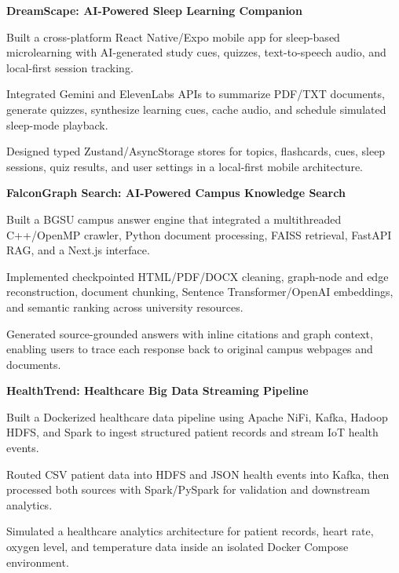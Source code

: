 \documentclass[letterpaper,10pt]{article}
\newcommand{\projectHeading}[2]{
  \vspace{2pt}
  \textbf{#1} \hfill #2
}
\begin{document}
\projectHeading{DreamScape: AI-Powered Sleep Learning Companion}{}
\begin{tightitemize}
  \item Built a cross-platform React Native/Expo mobile app for sleep-based microlearning with AI-generated study cues, quizzes, text-to-speech audio, and local-first session tracking.
  \item Integrated Gemini and ElevenLabs APIs to summarize PDF/TXT documents, generate quizzes, synthesize learning cues, cache audio, and schedule simulated sleep-mode playback.
  \item Designed typed Zustand/AsyncStorage stores for topics, flashcards, cues, sleep sessions, quiz results, and user settings in a local-first mobile architecture.
\end{tightitemize}

\projectHeading{FalconGraph Search: AI-Powered Campus Knowledge Search}{}
\begin{tightitemize}
  \item Built a BGSU campus answer engine that integrated a multithreaded C++/OpenMP crawler, Python document processing, FAISS retrieval, FastAPI RAG, and a Next.js interface.
  \item Implemented checkpointed HTML/PDF/DOCX cleaning, graph-node and edge reconstruction, document chunking, Sentence Transformer/OpenAI embeddings, and semantic ranking across university resources.
  \item Generated source-grounded answers with inline citations and graph context, enabling users to trace each response back to original campus webpages and documents.
\end{tightitemize}

\projectHeading{HealthTrend: Healthcare Big Data Streaming Pipeline}{}
\begin{tightitemize}
  \item Built a Dockerized healthcare data pipeline using Apache NiFi, Kafka, Hadoop HDFS, and Spark to ingest structured patient records and stream IoT health events.
  \item Routed CSV patient data into HDFS and JSON health events into Kafka, then processed both sources with Spark/PySpark for validation and downstream analytics.
  \item Simulated a healthcare analytics architecture for patient records, heart rate, oxygen level, and temperature data inside an isolated Docker Compose environment.
\end{tightitemize}
\end{document}
